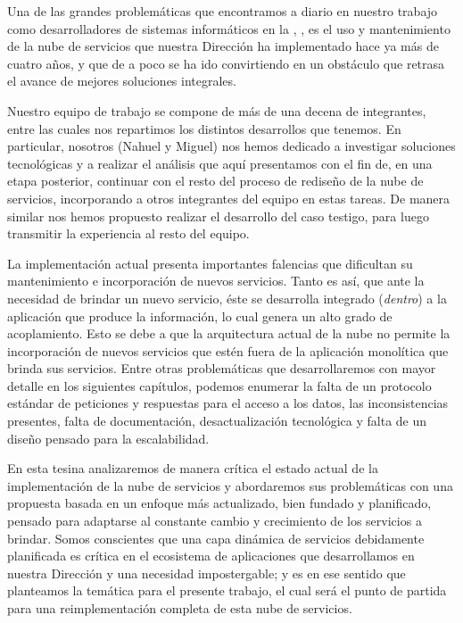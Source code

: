 
Una de las grandes problemáticas que encontramos a diario en nuestro trabajo como desarrolladores de sistemas informáticos en la \direccionDesarrollo, \unlp, es el uso y mantenimiento de la nube de servicios que nuestra Dirección ha implementado hace ya más de cuatro años, y que de a poco se ha ido convirtiendo en un obstáculo que retrasa el avance de mejores soluciones integrales. 

Nuestro equipo de trabajo se compone de más de una decena de integrantes, entre las cuales nos repartimos los distintos desarrollos que tenemos. En particular, nosotros (Nahuel y Miguel) nos hemos dedicado a investigar soluciones tecnológicas y a realizar el análisis que aquí presentamos con el fin de, en una etapa posterior, continuar con el resto del proceso de rediseño de la nube de servicios, incorporando a otros integrantes del equipo en estas tareas. De manera similar nos hemos propuesto realizar el desarrollo del caso testigo, para luego transmitir la experiencia al resto del equipo.

La implementación actual presenta importantes falencias que dificultan su mantenimiento e incorporación de nuevos servicios. Tanto es así, que ante la necesidad de brindar un nuevo servicio, éste se desarrolla integrado (\textit{dentro}) a la aplicación que produce la información, lo cual genera un alto grado de acoplamiento. Esto se debe a que la arquitectura actual de la nube no permite la incorporación de nuevos servicios que estén fuera de la aplicación monolítica que brinda sus servicios. Entre otras problemáticas que desarrollaremos con mayor detalle en los siguientes capítulos, podemos enumerar la falta de un protocolo estándar de peticiones y respuestas para el acceso a los datos, las inconsistencias presentes, falta de documentación, desactualización tecnológica y falta de un diseño pensado para la escalabilidad.

En esta tesina analizaremos de manera crítica el estado actual de la implementación de la nube de servicios y abordaremos sus problemáticas con una propuesta basada en un enfoque más actualizado, bien fundado y planificado, pensado para adaptarse al constante cambio y crecimiento de los servicios a brindar. Somos conscientes que una capa dinámica de servicios debidamente planificada es crítica en el ecosistema de aplicaciones que desarrollamos en nuestra Dirección y una necesidad impostergable; y es en ese sentido que planteamos la temática para el presente trabajo, el cual será el punto de partida para una reimplementación completa de esta nube de servicios.
